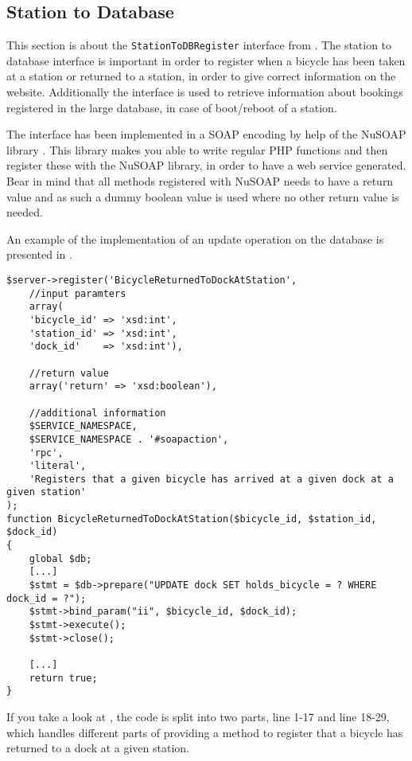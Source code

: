 \subsection{Station to Database}\label{sec:stationToWebI}
This section is about the \texttt{StationToDBRegister} interface from .
The station to database interface is important in order to register when a bicycle has been taken at a station or returned to a station, in order to give correct information on the website.
Additionally the interface is used to retrieve information about bookings registered in the large database, in case of boot/reboot of a station.

The interface has been implemented in a SOAP encoding by help of the NuSOAP library \citep{misc:nusoap}.
This library makes you able to write regular PHP functions and then register these with the NuSOAP library, in order to have a web service generated.
Bear in mind that all methods registered with NuSOAP needs to have a return value and as such a dummy boolean value is used where no other return value is needed.

An example of the implementation of an update operation on the database is presented in .

\begin{minipage}{\textwidth}
\begin{lstlisting}[caption = {Method for registering a bicycle has been returned to a dock at a given station.}, label = {lst:bicycledockstationreturned}]
$server->register('BicycleReturnedToDockAtStation',
	//input paramters
	array(	
	'bicycle_id' => 'xsd:int', 
	'station_id' => 'xsd:int',
	'dock_id'    => 'xsd:int'),
	
	//return value
 	array('return' => 'xsd:boolean'),
 	
 	//additional information
	$SERVICE_NAMESPACE,
	$SERVICE_NAMESPACE . '#soapaction',
	'rpc',
	'literal',
	'Registers that a given bicycle has arrived at a given dock at a given station'
);
function BicycleReturnedToDockAtStation($bicycle_id, $station_id, $dock_id)
{
	global $db;
	[...]
	$stmt = $db->prepare("UPDATE dock SET holds_bicycle = ? WHERE  dock_id = ?");
	$stmt->bind_param("ii", $bicycle_id, $dock_id);
	$stmt->execute();
	$stmt->close();
	
	[...]
	return true;
}
\end{lstlisting}
\end{minipage}

If you take a look at , the code is split into two parts, line 1-17 and line 18-29, which handles different parts of providing a method to register that a bicycle has returned to a dock at a given station.

